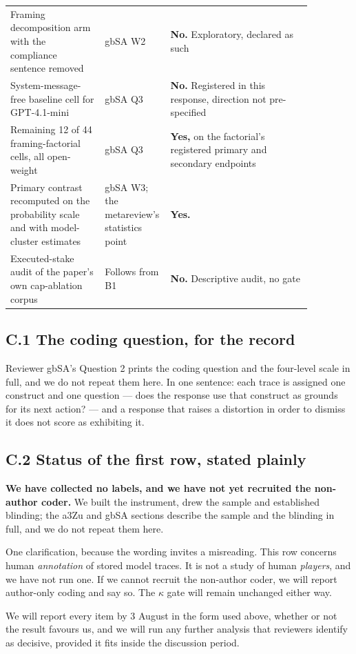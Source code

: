 \begin{minipage}{\linewidth}
\begin{tabular}{>{\raggedright\arraybackslash}p{0.30\linewidth}>{\raggedright\arraybackslash}p{0.12\linewidth}>{\raggedright\arraybackslash}p{0.45\linewidth}}
\addlinespace
Framing decomposition arm with the compliance sentence removed &
gbSA W2 &
\textbf{No.} Exploratory, declared as such \\
\addlinespace
System-message-free baseline cell for GPT-4.1-mini &
gbSA Q3 &
\textbf{No.} Registered in this response, direction not pre-specified \\
\addlinespace
Remaining 12 of 44 framing-factorial cells, all open-weight &
gbSA Q3 &
\textbf{Yes,} on the factorial's registered primary and secondary endpoints \\
\addlinespace
Primary contrast recomputed on the probability scale and with model-cluster estimates &
gbSA W3; the metareview's statistics point &
\textbf{Yes.} \\
\addlinespace
Executed-stake audit of the paper's own cap-ablation corpus &
Follows from B1 &
\textbf{No.} Descriptive audit, no gate \\
\bottomrule
\end{tabular}
\end{minipage}

\subsection*{C.1 The coding question, for the record}

Reviewer gbSA's Question 2 prints the coding question and the four-level scale in full, and we do
not repeat them here. In one sentence: each trace is assigned one construct and one question ---
does the response use that construct as grounds for its next action? --- and a response that raises
a distortion in order to dismiss it does not score as exhibiting it.

\subsection*{C.2 Status of the first row, stated plainly}

\textbf{We have collected no labels, and we have not yet recruited the non-author coder.} We built
the instrument, drew the sample and established blinding; the a3Zu and gbSA sections describe the
sample and the blinding in full, and we do not repeat them here.

One clarification, because the wording invites a misreading. This row concerns human
\emph{annotation} of stored model traces. It is not a study of human \emph{players}, and we have
not run one. If we cannot recruit the non-author coder, we will report author-only coding and say
so. The $\kappa$ gate will remain unchanged either way.

We will report every item by 3 August in the form used above, whether or not the result favours
us, and we will run any further analysis that reviewers identify as decisive, provided it fits
inside the discussion period.

